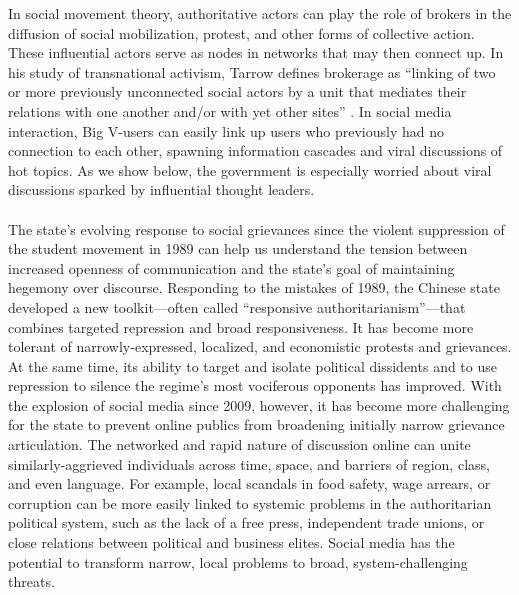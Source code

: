 \documentclass[12pt]{article}
\begin{document}
\begin{CJK*}{UTF8}{gbsn}
In social movement theory, authoritative actors can play the role of brokers in the diffusion of social mobilization, protest, and other forms of collective action. These influential actors serve as nodes in networks that may then connect up. In his  study of  transnational activism, Tarrow defines brokerage as ``linking of two or more previously unconnected social actors by a unit that mediates their relations with one another and/or with yet other sites'' \citep[190]{tarrow2005new}. In social media interaction, Big V-users can easily link up users who previously had no connection to each other, spawning information cascades and viral discussions of hot topics. As we show below, the government is especially worried about viral discussions sparked by influential thought leaders.

\paragraph{} The state's evolving response to social grievances since the violent suppression of the student movement in 1989 can help us understand the tension between increased openness of communication and the state's goal of maintaining hegemony over discourse. Responding to the mistakes of 1989, the Chinese state developed a new toolkit---often called ``responsive authoritarianism''---that combines targeted repression and broad responsiveness. It has become more tolerant of narrowly-expressed, localized, and economistic protests and grievances. At the same time, its ability to target and isolate political dissidents and to use repression to silence the regime's most vociferous opponents has improved. With the explosion of social media since 2009, however, it has become more challenging for the state to prevent online publics from broadening initially narrow grievance articulation. The networked and rapid nature of discussion online can unite similarly-aggrieved individuals across time, space, and barriers of region, class, and even language. For example, local scandals in food safety, wage arrears, or corruption can be more easily linked to systemic problems in the authoritarian political system, such as the lack of a free press, independent trade unions, or close relations between political and business elites. Social media has the potential to transform narrow, local problems to broad, system-challenging threats.
 

\end{CJK*}
\end{document}
